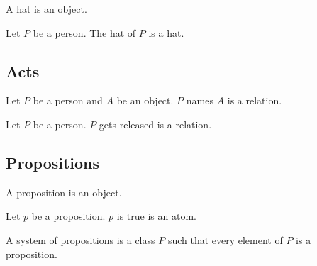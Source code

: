 \documentclass{article}
\begin{document}
\begin{signature*}[forthel]
  A hat is an object.
\end{signature*}

\begin{signature*}[forthel]
  Let $P$ be a person.
  The hat of $P$ is a hat.
\end{signature*}


\subsection{Acts}

\begin{signature*}[forthel]
  Let $P$ be a person and $A$ be an object.
  $P$ names $A$ is a relation.
\end{signature*}

\begin{signature*}[forthel]
  Let $P$ be a person.
  $P$ gets released is a relation.
\end{signature*}


\subsection{Propositions}

\begin{signature*}[forthel]
  A proposition is an object.
\end{signature*}

\begin{signature*}[forthel]
  Let $p$ be a proposition.
  $p$ is true is an atom.
\end{signature*}

\begin{definition*}[forthel]
  A system of propositions is a class $P$ such that every element of $P$ is a proposition.
\end{definition*}
\end{document}
